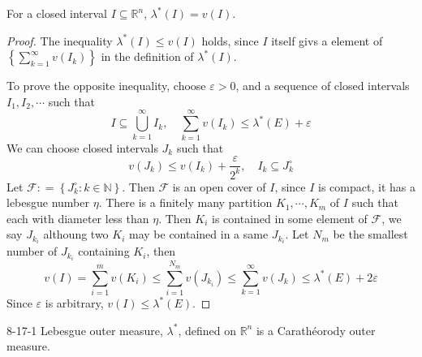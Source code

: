\documentclass[../main.tex]{subfiles}
\begin{document}
\begin{theorem}{}{}
    For a closed interval \(  I\subseteq \mathbb{R} ^{n}  \), \(   \lambda ^{*}\left( I \right)= v\left( I \right)    \).   
\end{theorem}

\begin{proof}
    The inequality \(   \lambda ^{*}\left( I \right)\le v\left( I \right)    \) holds, since \(  I  \) itself givs a element of \(  \left\{ \sum _{k = 1}^{\infty}v\left( I _{k} \right)  \right\}  \)   in the definition of \(   \lambda ^{*}\left( I \right)   \). 

    To prove the opposite inequality, choose \(   \varepsilon > 0  \), and a sequence of closed intervals \(  I_1,I_2,\cdots   \) such that \[
    I\subseteq \bigcup _{k = 1}^{\infty}I _{k},\quad \sum _{ k= 1}^{\infty}v\left( I _{k} \right) \le  \lambda ^{*}\left( E \right)+  \varepsilon   
    \]  We can choose closed intervals \(  J_{k}  \) such that \[
    v\left( J_{k} \right)\le v\left( I _{k} \right)+ \frac{ \varepsilon  }{2^{k} },\quad  I _{k}\subseteq J_{k}^{\circ}   
    \]Let \(  \mathcal{F}  : =  \left\{ J_{k}^{\circ}:k \in \mathbb{N}  \right\}\).    Then \(  \mathcal{F}  \) is an open cover of \(  I  \), since \(  I  \) is compact, it has a lebesgue number \(  \eta   \).    There is a finitely many partition \(   K_1,\cdots,K_m   \) of \(  I  \) such that each  with diameter less than \(  \eta   \). Then \(  K_{i}  \) is contained in some  element of \(  \mathcal{F}  \), we say \(  J_{k_{i}}  \)    althoung two \(  K_{i}  \) may be contained in a same \(  J_{k_{i}}  \).  Let \(  N_{m}  \) be the smallest number of \(  J_{k_{i}}  \) containing \(  K_{i}  \), then \[
    v\left( I \right)= \sum _{i= 1}^{m}v\left( K_{i} \right)\le \sum _{i = 1}^{N_{m}}v\left( J_{k_{i}} \right)\le \sum _{ k = 1}^{\infty}v\left( J_{k} \right)    \le   \lambda ^{*}\left( E \right)+ 2 \varepsilon  
    \]     Since \(   \varepsilon   \) is arbitrary, \(  v\left( I \right)\le  \lambda ^{*}\left( E \right)    \).   
\end{proof}

\begin{theorem}{}{8-17-1}
    Lebesgue outer measure, \(   \lambda ^{*}  \), defined on \(  \mathbb{R} ^{n}  \) is a Carath\'eorody outer measure.  
\end{theorem}
\end{document}
